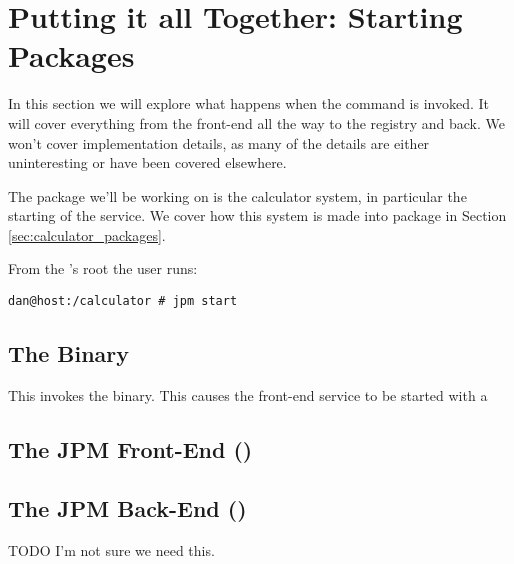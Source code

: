 \section{Putting it all Together: Starting Packages}

In this section we will explore what happens when the  command
is invoked. It will cover everything from the front-end all the way to the
registry and back. We won't cover implementation details, as many of the
details are either uninteresting or have been covered elsewhere.

The package we'll be working on is the calculator system, in particular the
starting of the  service. We cover how this system is made
into package in Section \ref{sec:calculator_packages}.

From the 's root the user runs:

\begin{verbatim}
dan@host:/calculator # jpm start
\end{verbatim}

\subsection{The  Binary}

This invokes the  binary. This causes the front-end service to be
started with a 

\subsection{The JPM Front-End ()}

\subsection{The JPM Back-End ()}


TODO I'm not sure we need this.
